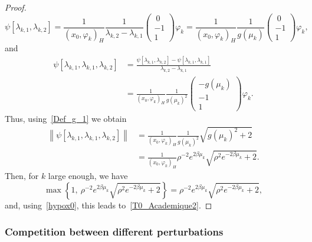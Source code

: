 \documentclass[10pt]{amsart}
\theoremstyle{definition}\newtheorem{defi}[theo]{Definition}\newtheorem{rema}[theo]{Remark}\newtheorem{exam}[theo]{Example}\newtheorem{exem}[theo]{Example}\newtheorem{nota}[theo]{Notation}
\newcommand{\normeX}[1]{\left\| #1 \right\|}
\newcommand{\psH}[2]{\left(#1, #2 \right)_H}
\begin{document}
\begin{proof}
\begin{equation*}
\psi[\lambda_{k,1}, \lambda_{k,2}] = \frac{1}{\psH{x_0}{\varphi_k}} \frac{1}{\lambda_{k,2}-\lambda_{k,1}}
\begin{pmatrix} \ 0\\-1\\1
\end{pmatrix} \varphi_k
= \frac{1}{\psH{x_0}{\varphi_k}} \frac{1}{g(\mu_k)}
\begin{pmatrix} \ 0\\-1\\1
\end{pmatrix} \varphi_k,
\end{equation*}
and
\begin{align*}
\psi[\lambda_{k,1},\lambda_{k,1},\lambda_{k,2}] &= \frac{\psi[\lambda_{k,1},\lambda_{k,2}]-\psi[\lambda_{k,1},\lambda_{k,1}]}{\lambda_{k,2}-\lambda_{k,1}}
\\
&= \frac{1}{\psH{x_0}{\varphi_k}} \frac{1}{g(\mu_k)^2 }
\begin{pmatrix} -g(\mu_k) \\ -1 \\ 1
\end{pmatrix} \varphi_k.
\end{align*}
Thus, using~\eqref{Def_g_1} we obtain
\begin{align*}
\normeX{ \psi[\lambda_{k,1}, \lambda_{k,1}, \lambda_{k,2}] } &= \frac{1}{\psH{x_0}{\varphi_k}} \frac{1}{g(\mu_k)^2 } \sqrt{g(\mu_k)^2+2}
\\
&= \frac{1}{\psH{x_0}{\varphi_k}} \rho^{-2} e^{2\beta \mu_k} \sqrt{\rho^2 e^{-2\beta \mu_k}+2}.
\end{align*}
Then, for $k$ large enough, we have
\[
\max \left\{ 1, \: \rho^{-2}e^{2\beta \mu_k} \sqrt{\rho^2 e^{-2\beta \mu_k}+2} \right\} = \rho^{-2} e^{2\beta \mu_k} \sqrt{\rho^2 e^{-2\beta \mu_k}+2},
\]
and, using~\eqref{hypox0}, this leads to~\eqref{T0_Academique2}.
\end{proof}



\subsubsection{Competition between different perturbations}\label{secexample3x3}
\end{document}
